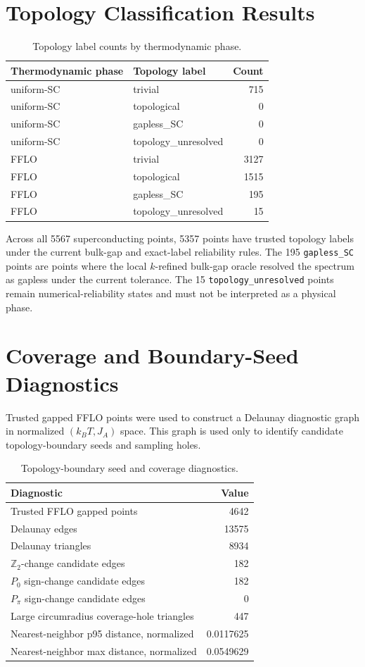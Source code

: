 \documentclass[11pt]{article}
\begin{document}
\section{Topology Classification Results}

\begin{table}[H]
\centering
\caption{Topology label counts by thermodynamic phase.}
\begin{tabular}{llr}
\toprule
Thermodynamic phase & Topology label & Count\\
\midrule
uniform-SC & trivial & 715\\
uniform-SC & topological & 0\\
uniform-SC & gapless\_SC & 0\\
uniform-SC & topology\_unresolved & 0\\
FFLO & trivial & 3127\\
FFLO & topological & 1515\\
FFLO & gapless\_SC & 195\\
FFLO & topology\_unresolved & 15\\
\bottomrule
\end{tabular}
\end{table}

Across all 5567 superconducting points, 5357 points have trusted topology
labels under the current bulk-gap and exact-label reliability rules.  The 195
\texttt{gapless\_SC} points are points where the local $k$-refined bulk-gap
oracle resolved the spectrum as gapless under the current tolerance.  The 15
\texttt{topology\_unresolved} points remain numerical-reliability states and
must not be interpreted as a physical phase.

\section{Coverage and Boundary-Seed Diagnostics}

Trusted gapped FFLO points were used to construct a Delaunay diagnostic graph
in normalized $(k_BT,J_A)$ space.  This graph is used only to identify
candidate topology-boundary seeds and sampling holes.

\begin{table}[H]
\centering
\caption{Topology-boundary seed and coverage diagnostics.}
\begin{tabular}{lr}
\toprule
Diagnostic & Value\\
\midrule
Trusted FFLO gapped points & 4642\\
Delaunay edges & 13575\\
Delaunay triangles & 8934\\
$\mathbb{Z}_2$-change candidate edges & 182\\
$P_0$ sign-change candidate edges & 182\\
$P_\pi$ sign-change candidate edges & 0\\
Large circumradius coverage-hole triangles & 447\\
Nearest-neighbor p95 distance, normalized & 0.0117625\\
Nearest-neighbor max distance, normalized & 0.0549629\\
\bottomrule
\end{tabular}
\end{table}
\end{document}
